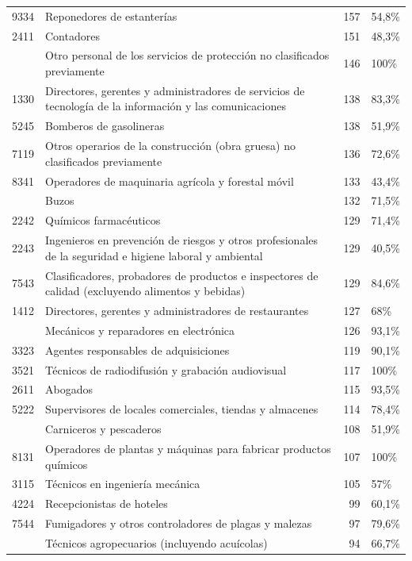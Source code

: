 \documentclass[
  11pt,
]{article}
\begin{document}
\begin{longtable}{r>{\raggedright\arraybackslash}p{9cm}rl}
9334 & Reponedores de estanterías & 157 & 54,8\%\\
2411 & Contadores & 151 & 48,3\%\\
\addlinespace
5419 & Otro personal de los servicios de protección no clasificados previamente & 146 & 100\%\\
1330 & Directores, gerentes y administradores de servicios de tecnología de la información y las comunicaciones & 138 & 83,3\%\\
5245 & Bomberos de gasolineras & 138 & 51,9\%\\
7119 & Otros operarios de la construcción (obra gruesa) no clasificados previamente & 136 & 72,6\%\\
8341 & Operadores de maquinaria agrícola y forestal móvil & 133 & 43,4\%\\
\addlinespace
7541 & Buzos & 132 & 71,5\%\\
2242 & Químicos farmacéuticos & 129 & 71,4\%\\
2243 & Ingenieros en prevención de riesgos y otros profesionales de la seguridad e higiene laboral y ambiental & 129 & 40,5\%\\
7543 & Clasificadores, probadores de productos e inspectores de calidad (excluyendo alimentos y bebidas) & 129 & 84,6\%\\
1412 & Directores, gerentes y administradores de restaurantes & 127 & 68\%\\
\addlinespace
7421 & Mecánicos y reparadores en electrónica & 126 & 93,1\%\\
3323 & Agentes responsables de adquisiciones & 119 & 90,1\%\\
3521 & Técnicos de radiodifusión y grabación audiovisual & 117 & 100\%\\
2611 & Abogados & 115 & 93,5\%\\
5222 & Supervisores de locales comerciales, tiendas y almacenes & 114 & 78,4\%\\
\addlinespace
7511 & Carniceros y pescaderos & 108 & 51,9\%\\
8131 & Operadores de plantas y máquinas para fabricar productos químicos & 107 & 100\%\\
3115 & Técnicos en ingeniería mecánica & 105 & 57\%\\
4224 & Recepcionistas de hoteles & 99 & 60,1\%\\
7544 & Fumigadores y otros controladores de plagas y malezas & 97 & 79,6\%\\
\addlinespace
3142 & Técnicos agropecuarios (incluyendo acuícolas) & 94 & 66,7\%\\

\end{longtable}
\end{document}
